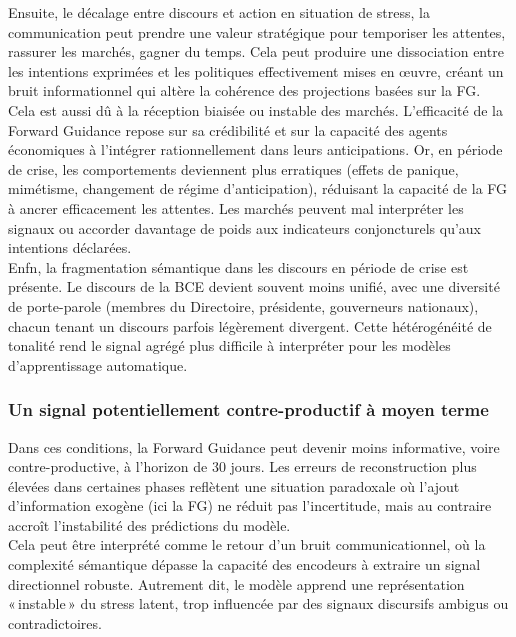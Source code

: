 Ensuite, le décalage entre discours et action en situation de stress, la communication peut prendre une valeur stratégique pour temporiser les attentes, rassurer les marchés, gagner du temps. Cela peut produire une dissociation entre les intentions exprimées et les politiques effectivement mises en œuvre, créant un bruit informationnel qui altère la cohérence des projections basées sur la FG.\\

Cela est aussi dû à la réception biaisée ou instable des marchés. L’efficacité de la Forward Guidance repose sur sa crédibilité et sur la capacité des agents économiques à l’intégrer rationnellement dans leurs anticipations. Or, en période de crise, les comportements deviennent plus erratiques (effets de panique, mimétisme, changement de régime d’anticipation), réduisant la capacité de la FG à ancrer efficacement les attentes. Les marchés peuvent mal interpréter les signaux ou accorder davantage de poids aux indicateurs conjoncturels qu’aux intentions déclarées.\\

Enfn, la fragmentation sémantique dans les discours en période de crise est présente. Le discours de la BCE devient souvent moins unifié, avec une diversité de porte-parole (membres du Directoire, présidente, gouverneurs nationaux), chacun tenant un discours parfois légèrement divergent. Cette hétérogénéité de tonalité rend le signal agrégé plus difficile à interpréter pour les modèles d’apprentissage automatique.

\subsubsection{Un signal potentiellement contre-productif à moyen terme}

Dans ces conditions, la Forward Guidance peut devenir moins informative, voire contre-productive, à l’horizon de 30 jours. Les erreurs de reconstruction plus élevées dans certaines phases reflètent une situation paradoxale où l’ajout d’information exogène (ici la FG) ne réduit pas l’incertitude, mais au contraire accroît l’instabilité des prédictions du modèle.\\

Cela peut être interprété comme le retour d’un bruit communicationnel, où la complexité sémantique dépasse la capacité des encodeurs à extraire un signal directionnel robuste. Autrement dit, le modèle apprend une représentation « instable » du stress latent, trop influencée par des signaux discursifs ambigus ou contradictoires.

